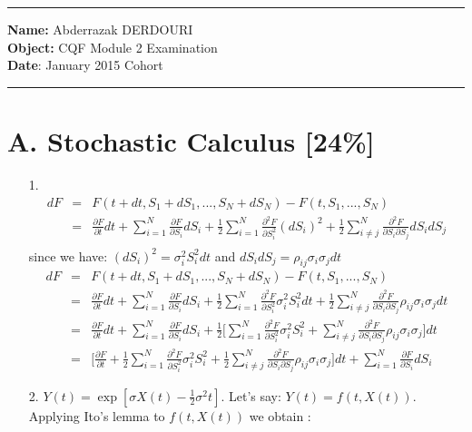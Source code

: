 \documentclass[11pt,oneside,a4paper, titlepage]{article}
\begin{document}
\hrule height 1pt
\vskip 0.2cm
\noindent \textbf{Name:} Abderrazak \textsc{DERDOURI}\\
\textbf{Object:} CQF Module 2 Examination\\
\textbf{Date}: January 2015 Cohort
\vskip 0.2cm
\hrule height 1pt
\section*{A. Stochastic Calculus [24\%]}
\begin{enumerate}
\item [1.]
\begin{eqnarray*}
dF&=&F(t+dt, S_1+dS_1,...,S_N+dS_N)-F(t, S_1,...,S_N)\\
&=&\frac{\partial F}{\partial t} dt + \sum_{i=1}^{N}\frac{\partial F}{\partial S_i}dS_i +
\frac{1}{2}\sum_{i=1}^{N} \frac{\partial^2 F}{ \partial S_i^{2}} (dS_i)^{2} + \frac{1}{2}\sum_{i\ne j}^{N} \frac{\partial^2 F}{\partial S_i \partial S_j} dS_i dS_j\\
\end{eqnarray*}
since we have: \((dS_i)^{2}=\sigma_i^2S_i^2dt\) and \(dS_id S_j=\rho_{ij}\sigma_i\sigma_jdt\)
\begin{eqnarray*}
dF&=&F(t+dt, S_1+dS_1,...,S_N+dS_N)-F(t, S_1,...,S_N)\\
&=&\frac{\partial F}{\partial t} dt + \sum_{i=1}^{N}\frac{\partial F}{\partial S_i}dS_i +
\frac{1}{2}\sum_{i=1}^{N} \frac{\partial^2 F}{ \partial S_i^{2}} \sigma_i^2S_i^2dt + \frac{1}{2}\sum_{i\ne j}^{N} \frac{\partial^2 F}{\partial S_i \partial S_j} \rho_{ij}\sigma_i\sigma_jdt\\
&=&\frac{\partial F}{\partial t} dt + \sum_{i=1}^{N}\frac{\partial F}{\partial S_i}dS_i +
\frac{1}{2}\bigg[\sum_{i=1}^{N} \frac{\partial^2 F}{ \partial S_i^{2}} \sigma_i^2S_i^2 + \sum_{i\ne j}^{N} \frac{\partial^2 F}{\partial S_i \partial S_j} \rho_{ij}\sigma_i\sigma_j\bigg]dt\\
&=& \bigg[\frac{\partial F}{\partial t} + \frac{1}{2}\sum_{i=1}^{N} \frac{\partial^2 F}{ \partial S_i^{2}} \sigma_i^2S_i^2 + \frac{1}{2}\sum_{i\ne j}^{N} \frac{\partial^2 F}{\partial S_i \partial S_j} \rho_{ij}\sigma_i\sigma_j\bigg]dt + \sum_{i=1}^{N}\frac{\partial F}{\partial S_i}dS_i
\end{eqnarray*}
\item [2.]
\(Y(t)=\exp[\sigma X(t)-\frac{1}{2}\sigma^2 t]\). Let's say: \(Y(t)=f(t, X(t))\).\\
Applying Ito's lemma to \(f(t, X(t))\) we obtain :
\begin{eqnarray*}

\end{eqnarray*}
\end{enumerate}
\end{document}
